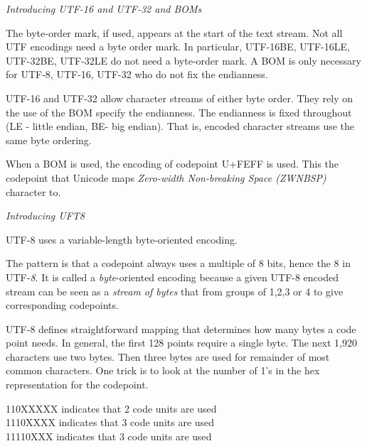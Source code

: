 \frmrule 


\textit{Introducing UTF-16 and UTF-32 and BOMs}





The byte-order mark, if used, appears at the start of the text stream. Not all UTF encodings need a 
byte order mark. In particular, UTF-16BE, UTF-16LE, UTF-32BE, UTF-32LE do not need 
a byte-order mark. A BOM is only necessary for UTF-8, UTF-16, UTF-32 who do not fix the endianness.


UTF-16 and UTF-32 allow character streams of either byte order.  
They rely on the use of the BOM specify the endianness.
The endianness is fixed throughout (LE - little endian, BE- big endian).
That is, encoded character streams use the same byte ordering. 

When a BOM is used, the encoding of codepoint U+FEFF is used. 
This the codepoint that Unicode maps \textit{Zero-width Non-breaking Space (ZWNBSP)} 
character to. 

\frmrule 





\frmrule 

\textit{Introducing UFT8}

UTF-8 uses a variable-length byte-oriented encoding. 

The pattern is that a codepoint always uses a multiple of 8 bits, hence the 8 in UTF-\textit{8}. 
It is called a \textit{byte}-oriented encoding because a given UTF-8 encoded 
stream can be seen as a \textit{stream of bytes} that from groups of 1,2,3 or 4 to give 
corresponding codepoints.  



UTF-8 defines straightforward mapping that determines how many bytes a code point 
needs. In general, the first 128 points require a single byte.
The next 1,920 characters use two bytes. Then three bytes are used 
for remainder of most common characters. One trick is to look at the number of 
1's in the hex representation for the codepoint. 

110XXXXX indicates that 2 code units are used\\
1110XXXX indicates that 3 code units are used\\
11110XXX indicates that 3 code units are used\\


